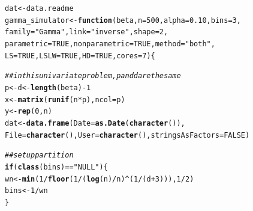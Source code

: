 \documentclass[11pt]{article}\usepackage[]{graphicx}\usepackage[]{color}
\makeatletter
\newcommand{\hlnum}[1]{\textcolor[rgb]{0.686,0.059,0.569}{#1}}%
\newcommand{\hlstr}[1]{\textcolor[rgb]{0.192,0.494,0.8}{#1}}%
\newcommand{\hlcom}[1]{\textcolor[rgb]{0.678,0.584,0.686}{\textit{#1}}}%
\newcommand{\hlopt}[1]{\textcolor[rgb]{0,0,0}{#1}}%
\newcommand{\hlstd}[1]{\textcolor[rgb]{0.345,0.345,0.345}{#1}}%
\newcommand{\hlkwa}[1]{\textcolor[rgb]{0.161,0.373,0.58}{\textbf{#1}}}%
\newcommand{\hlkwb}[1]{\textcolor[rgb]{0.69,0.353,0.396}{#1}}%
\newcommand{\hlkwc}[1]{\textcolor[rgb]{0.333,0.667,0.333}{#1}}%
\newcommand{\hlkwd}[1]{\textcolor[rgb]{0.737,0.353,0.396}{\textbf{#1}}}%
\newenvironment{kframe}{%
 \def\at@end@of@kframe{}%
 \ifinner\ifhmode%
  \def\at@end@of@kframe{\end{minipage}}%
  \begin{minipage}{\columnwidth}%
 \fi\fi%
 \def\FrameCommand##1{\hskip\@totalleftmargin \hskip-\fboxsep
 \colorbox{shadecolor}{##1}\hskip-\fboxsep
     \hskip-\linewidth \hskip-\@totalleftmargin \hskip\columnwidth}%
 \MakeFramed {\advance\hsize-\width
   \@totalleftmargin\z@ \linewidth\hsize
   \@setminipage}}%
 {\par\unskip\endMakeFramed%
 \at@end@of@kframe}
\newenvironment{knitrout}{}{} %
\makeatother
\begin{document}
\begin{knitrout}
\color{fgcolor}\begin{kframe}
\begin{alltt}
\hlstd{dat} \hlkwb{<-} \hlstd{data.readme}
\hlstd{gamma_simulator} \hlkwb{<-} \hlkwa{function}\hlstd{(}\hlkwc{beta}\hlstd{,} \hlkwc{n} \hlstd{=} \hlnum{500}\hlstd{,} \hlkwc{alpha} \hlstd{=} \hlnum{0.10}\hlstd{,} \hlkwc{bins} \hlstd{=} \hlnum{3}\hlstd{,}
  \hlkwc{family} \hlstd{=} \hlstr{"Gamma"}\hlstd{,} \hlkwc{link} \hlstd{=} \hlstr{"inverse"}\hlstd{,} \hlkwc{shape} \hlstd{=} \hlnum{2}\hlstd{,}
  \hlkwc{parametric} \hlstd{=} \hlnum{TRUE}\hlstd{,} \hlkwc{nonparametric} \hlstd{=} \hlnum{TRUE}\hlstd{,} \hlkwc{method} \hlstd{=} \hlstr{"both"}\hlstd{,}
  \hlkwc{LS} \hlstd{=} \hlnum{TRUE}\hlstd{,} \hlkwc{LSLW} \hlstd{=} \hlnum{TRUE}\hlstd{,} \hlkwc{HD} \hlstd{=} \hlnum{TRUE}\hlstd{,} \hlkwc{cores} \hlstd{=} \hlnum{7}\hlstd{)\{}

  \hlcom{## in this univariate problem, p and d are the same}
  \hlstd{p} \hlkwb{<-} \hlstd{d} \hlkwb{<-} \hlkwd{length}\hlstd{(beta)} \hlopt{-} \hlnum{1}
  \hlstd{x} \hlkwb{<-} \hlkwd{matrix}\hlstd{(}\hlkwd{runif}\hlstd{(n}\hlopt{*}\hlstd{p),} \hlkwc{ncol} \hlstd{= p)}
  \hlstd{y} \hlkwb{<-} \hlkwd{rep}\hlstd{(}\hlnum{0}\hlstd{,n)}
  \hlstd{dat} \hlkwb{<-} \hlkwd{data.frame}\hlstd{(}\hlkwc{Date}\hlstd{=}\hlkwd{as.Date}\hlstd{(}\hlkwd{character}\hlstd{()),}
    \hlkwc{File}\hlstd{=}\hlkwd{character}\hlstd{(),} \hlkwc{User}\hlstd{=}\hlkwd{character}\hlstd{(),} \hlkwc{stringsAsFactors}\hlstd{=}\hlnum{FALSE}\hlstd{)}

  \hlcom{## set up partition}
  \hlkwa{if}\hlstd{(}\hlkwd{class}\hlstd{(bins)} \hlopt{==} \hlstr{"NULL"}\hlstd{)\{}
    \hlstd{wn} \hlkwb{<-} \hlkwd{min}\hlstd{(}\hlnum{1}\hlopt{/} \hlkwd{floor}\hlstd{(}\hlnum{1} \hlopt{/} \hlstd{(}\hlkwd{log}\hlstd{(n)}\hlopt{/}\hlstd{n)}\hlopt{^}\hlstd{(}\hlnum{1}\hlopt{/}\hlstd{(d}\hlopt{+}\hlnum{3}\hlstd{))),} \hlnum{1}\hlopt{/}\hlnum{2}\hlstd{)}
    \hlstd{bins} \hlkwb{<-} \hlnum{1} \hlopt{/} \hlstd{wn}
  \hlstd{\}}


\end{alltt}
\end{kframe}
\end{knitrout}
\end{document}
